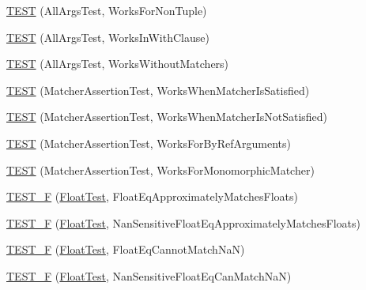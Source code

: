 \begin{DoxyCompactItemize}
\item 
\mbox{\hyperlink{namespacetesting_1_1gmock__matchers__test_aacc3ed6d6a0f9ff552019d0d58817b6f}{T\+E\+ST}} (All\+Args\+Test, Works\+For\+Non\+Tuple)
\item 
\mbox{\hyperlink{namespacetesting_1_1gmock__matchers__test_ad62534535946b2ef45457fb653f73a98}{T\+E\+ST}} (All\+Args\+Test, Works\+In\+With\+Clause)
\item 
\mbox{\hyperlink{namespacetesting_1_1gmock__matchers__test_ab923c90d7512191ce1cb37055e76e9b9}{T\+E\+ST}} (All\+Args\+Test, Works\+Without\+Matchers)
\item 
\mbox{\hyperlink{namespacetesting_1_1gmock__matchers__test_ad37559f9112c04334a62ce9617cf1349}{T\+E\+ST}} (Matcher\+Assertion\+Test, Works\+When\+Matcher\+Is\+Satisfied)
\item 
\mbox{\hyperlink{namespacetesting_1_1gmock__matchers__test_a2f3755be7052d6e7769e3323053399d0}{T\+E\+ST}} (Matcher\+Assertion\+Test, Works\+When\+Matcher\+Is\+Not\+Satisfied)
\item 
\mbox{\hyperlink{namespacetesting_1_1gmock__matchers__test_afcf1287c7fd759157367026613ddd727}{T\+E\+ST}} (Matcher\+Assertion\+Test, Works\+For\+By\+Ref\+Arguments)
\item 
\mbox{\hyperlink{namespacetesting_1_1gmock__matchers__test_a0fe4bde05f667c4877e3b4a4a7bde002}{T\+E\+ST}} (Matcher\+Assertion\+Test, Works\+For\+Monomorphic\+Matcher)
\item 
\mbox{\hyperlink{namespacetesting_1_1gmock__matchers__test_a69257e935b4334c835b3ad26acea9104}{T\+E\+S\+T\+\_\+F}} (\mbox{\hyperlink{namespacetesting_1_1gmock__matchers__test_a145329e433869625f9f0e98a0cdfd7b4}{Float\+Test}}, Float\+Eq\+Approximately\+Matches\+Floats)
\item 
\mbox{\hyperlink{namespacetesting_1_1gmock__matchers__test_abb691880cd22f6f444c978547b13f792}{T\+E\+S\+T\+\_\+F}} (\mbox{\hyperlink{namespacetesting_1_1gmock__matchers__test_a145329e433869625f9f0e98a0cdfd7b4}{Float\+Test}}, Nan\+Sensitive\+Float\+Eq\+Approximately\+Matches\+Floats)
\item 
\mbox{\hyperlink{namespacetesting_1_1gmock__matchers__test_a111f0c8a5ec17b47e8eb6226e1c2cb58}{T\+E\+S\+T\+\_\+F}} (\mbox{\hyperlink{namespacetesting_1_1gmock__matchers__test_a145329e433869625f9f0e98a0cdfd7b4}{Float\+Test}}, Float\+Eq\+Cannot\+Match\+NaN)
\item 
\mbox{\hyperlink{namespacetesting_1_1gmock__matchers__test_a4e9d89902e088a10915b4f9463ac0f09}{T\+E\+S\+T\+\_\+F}} (\mbox{\hyperlink{namespacetesting_1_1gmock__matchers__test_a145329e433869625f9f0e98a0cdfd7b4}{Float\+Test}}, Nan\+Sensitive\+Float\+Eq\+Can\+Match\+NaN)

\end{DoxyCompactItemize}
